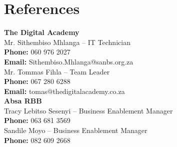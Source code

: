\documentclass[a4paper,10pt]{article}
\begin{document}
\section{References}
\textbf{The Digital Academy}\\
Mr. Sithembiso Mhlanga – IT Technician\\
\textbf{Phone:} 060 976 2027\\
\textbf{Email:} Sithembiso.Mhlanga@sanbs.org.za\\

Mr. Tommas Fihla – Team Leader\\
\textbf{Phone:} 067 280 6288\\
\textbf{Email:} tomas@thedigitalacademy.co.za\\

\textbf{Absa RBB}\\
Tracy Lebitso Sesenyi – Business Enablement Manager\\
\textbf{Phone:} 063 681 3569\\

Sandile Moyo – Business Enablement Manager\\
\textbf{Phone:} 082 609 2668
\end{document}
